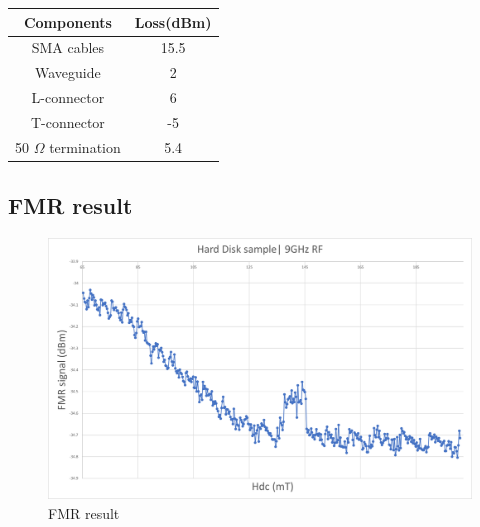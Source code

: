 \documentclass[12pt,a4paper,bold]{thesis}
\theoremstyle{thm}
\theoremstyle{definition}
\begin{document}
\begin{center}
\begin{tabular}{||c c||} 
 \hline
 Components & Loss(dBm) \\ [0.5ex] 
 \hline\hline
 SMA cables & 15.5 \\ 
 Waveguide & 2 \\
 L-connector & 6 \\
 T-connector & -5 \\
 50 $\Omega$ termination & 5.4 \\  [1ex] 
 \hline
\end{tabular}
\end{center}
\subsection{FMR result}
\begin{figure}[H]
	\centering
   \includegraphics[scale=0.56]{Images/43.png} 
   \caption{FMR result}
\end{figure}
\end{document}
